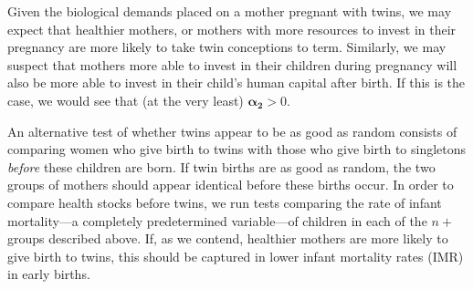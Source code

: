 \documentclass[subeqn]{article}
\begin{document}
\begin{spacing}{1.4}
Given the biological demands placed on a mother pregnant with twins, we may 
expect that healthier mothers, or mothers with more resources to invest in their
pregnancy are more likely to take twin conceptions to term.  Similarly, we may
suspect that mothers more able to invest in their children during pregnancy will 
also be more able to invest in their child's human capital after birth.  If this 
is the case, we would see that (at the very least) $\bm{\alpha_2}>0$.  

An alternative test of whether twins appear to be as good as random consists of 
comparing women who give birth to twins with those who give birth to singletons 
\emph{before} these children are born.  If twin births are as good as random, 
the two groups of mothers should appear identical before these births occur.
In order to compare health stocks before twins, we run tests comparing the rate
of infant mortality---a completely predetermined variable---of children in each 
of the $n+$ groups described above.  If, as we contend, healthier mothers are 
more likely to give birth to twins, this should be captured in lower infant 
mortality rates (IMR) in early births.


\end{spacing}
\end{document}
